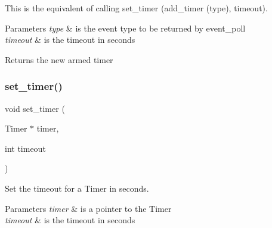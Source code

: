 This is the equivalent of calling set\+\_\+timer (add\+\_\+timer (type), timeout). 
\begin{DoxyParams}{Parameters}
{\em type} & is the event type to be returned by event\+\_\+poll \\
\hline
{\em timeout} & is the timeout in seconds \\
\hline
\end{DoxyParams}
\begin{DoxyReturn}{Returns}
the new armed timer 
\end{DoxyReturn}
\mbox{\label{group__timer_gacbdc140f686e71964beb4e5608313b5b}} 
\subsubsection{\texorpdfstring{set\+\_\+timer()}{set\_timer()}}
{\footnotesize\ttfamily void set\+\_\+timer (\begin{DoxyParamCaption}\item[{Timer $\ast$}]{timer,  }\item[{int}]{timeout }\end{DoxyParamCaption})}



Set the timeout for a Timer in seconds. 


\begin{DoxyParams}{Parameters}
{\em timer} & is a pointer to the Timer \\
\hline
{\em timeout} & is the timeout in seconds \\
\hline
\end{DoxyParams}
